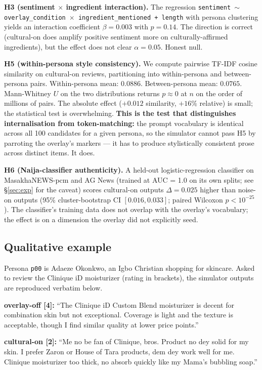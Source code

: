 \documentclass[8pt,twocolumn,a4paper]{extarticle}
\begin{document}
\textbf{H3 (sentiment $\times$ ingredient interaction).} The regression \texttt{sentiment $\sim$ overlay\_condition $\times$ ingredient\_mentioned + length} with persona clustering yields an interaction coefficient $\beta = 0.003$ with $p = 0.14$. The direction is correct (cultural-on does amplify positive sentiment more on culturally-affirmed ingredients), but the effect does not clear $\alpha = 0.05$. Honest null.

\textbf{H5 (within-persona style consistency).} We compute pairwise TF-IDF cosine similarity on cultural-on reviews, partitioning into within-persona and between-persona pairs. Within-persona mean: $0.0886$. Between-persona mean: $0.0765$. Mann-Whitney $U$ on the two distributions returns $p \approx 0$ at $n$ on the order of millions of pairs. The absolute effect ($+0.012$ similarity, $+16\%$ relative) is small; the statistical test is overwhelming. \textbf{This is the test that distinguishes internalisation from token-matching:} the prompt vocabulary is identical across all 100 candidates for a given persona, so the simulator cannot pass H5 by parroting the overlay's markers --- it has to produce stylistically consistent prose across distinct items. It does. \checkmark

\textbf{H6 (Naija-classifier authenticity).} A held-out logistic-regression classifier on MasakhaNEWS-pcm and AG News (trained at AUC = 1.0 on its own splits; see \S\ref{sec:exp} for the caveat) scores cultural-on outputs $\Delta = 0.025$ higher than noise-on outputs (95\% cluster-bootstrap CI $[0.016, 0.033]$; paired Wilcoxon $p < 10^{-25}$). The classifier's training data does not overlap with the overlay's vocabulary; the effect is on a dimension the overlay did not explicitly seed. \checkmark

\subsection{Qualitative example}

Persona \texttt{p00} is Adaeze Okonkwo, an Igbo Christian shopping for skincare. Asked to review the Clinique iD moisturizer (rating in brackets), the simulator outputs are reproduced verbatim below.

\begin{tcolorbox}[colback=gray!4,colframe=gray!50,arc=2pt,boxrule=0.5pt,left=4pt,right=4pt,top=4pt,bottom=4pt,fontupper=\small]
\textbf{overlay-off [4]:} ``The Clinique iD Custom Blend moisturizer is decent for combination skin but not exceptional. Coverage is light and the texture is acceptable, though I find similar quality at lower price points.''

\medskip
\textbf{cultural-on [2]:} ``Me no be fan of Clinique, bros. Product no dey solid for my skin. I prefer Zaron or House of Tara products, dem dey work well for me. Clinique moisturizer too thick, no absorb quickly like my Mama's bubbling soap.''
\end{tcolorbox}
\end{document}
